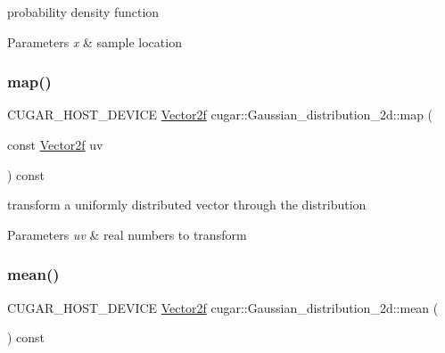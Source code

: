 probability density function


\begin{DoxyParams}{Parameters}
{\em x} & sample location \\
\hline
\end{DoxyParams}
\mbox{\label{structcugar_1_1_gaussian__distribution__2d_a2a225669b7d1f39a0d946a551561f26f}} 
\subsubsection{\texorpdfstring{map()}{map()}}
{\footnotesize\ttfamily C\+U\+G\+A\+R\+\_\+\+H\+O\+S\+T\+\_\+\+D\+E\+V\+I\+CE \hyperlink{structcugar_1_1_vector}{Vector2f} cugar\+::\+Gaussian\+\_\+distribution\+\_\+2d\+::map (\begin{DoxyParamCaption}\item[{const \hyperlink{structcugar_1_1_vector}{Vector2f}}]{uv }\end{DoxyParamCaption}) const\hspace{0.3cm}{\ttfamily [inline]}}

transform a uniformly distributed vector through the distribution


\begin{DoxyParams}{Parameters}
{\em uv} & real numbers to transform \\
\hline
\end{DoxyParams}
\mbox{\label{structcugar_1_1_gaussian__distribution__2d_a76ef27708f0faf2dc05df010ac7a832c}} 
\subsubsection{\texorpdfstring{mean()}{mean()}}
{\footnotesize\ttfamily C\+U\+G\+A\+R\+\_\+\+H\+O\+S\+T\+\_\+\+D\+E\+V\+I\+CE \hyperlink{structcugar_1_1_vector}{Vector2f} cugar\+::\+Gaussian\+\_\+distribution\+\_\+2d\+::mean (\begin{DoxyParamCaption}{ }\end{DoxyParamCaption}) const\hspace{0.3cm}{\ttfamily [inline]}}

